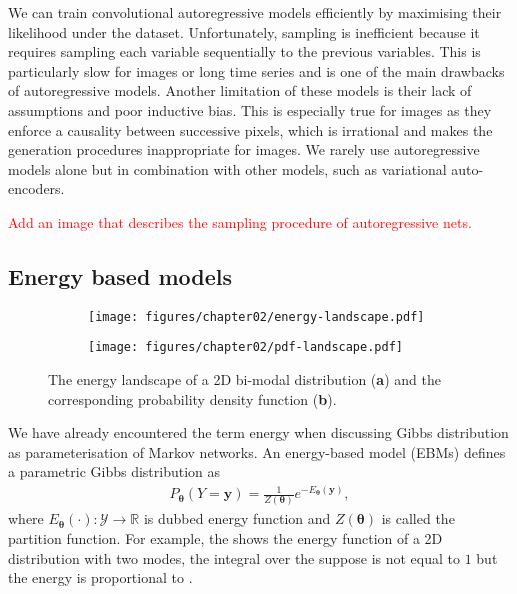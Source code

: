 We can train convolutional autoregressive models efficiently by maximising their likelihood under the dataset. Unfortunately, sampling is inefficient because it requires sampling each variable sequentially to the previous variables. This is particularly slow for images or long time series and is one of the main drawbacks of autoregressive models. Another limitation of these models is their lack of assumptions and poor inductive bias. This is especially true for images as they enforce a causality between successive pixels, which is irrational and makes the generation procedures inappropriate for images. We rarely use autoregressive models alone but in combination with other models, such as variational auto-encoders.

\textcolor{red}{Add an image that describes the sampling procedure of autoregressive nets.}
\subsection{Energy based models}
\begin{figure*}
  \centering
  \begin{subfigure}{.48\textwidth}
    \centering
    \texttt{[image: figures/chapter02/energy-landscape.pdf]}
    \caption{}
    \label{fig:Energy}
  \end{subfigure}
  \begin{subfigure}{.48\textwidth}
    \centering
    \texttt{[image: figures/chapter02/pdf-landscape.pdf]}
    \caption{}
    \label{fig:pdf}
  \end{subfigure}
  \caption{The energy landscape of a 2D bi-modal distribution (\textbf{a}) and the corresponding probability density function (\textbf{b}).}
\end{figure*}
We have already encountered the term energy when discussing Gibbs distribution as parameterisation of Markov networks. An energy-based model (EBMs)  defines a parametric Gibbs distribution as
\begin{align}
  P_{\bm{\theta}}(Y=\bm{y}) = \frac{1}{Z(\bm{\theta})} e^{-E_{\bm{\theta}}(\bm{y})},
\end{align}
where $E_{\bm{\theta}}(\cdot): \mathcal{Y}\rightarrow \mathbb{R}$ is dubbed energy function and $Z(\bm{\theta})$ is called the partition function. For example, the  shows the energy function of a 2D distribution with two modes, the integral over the suppose is not equal to $1$ but the energy is proportional to .

